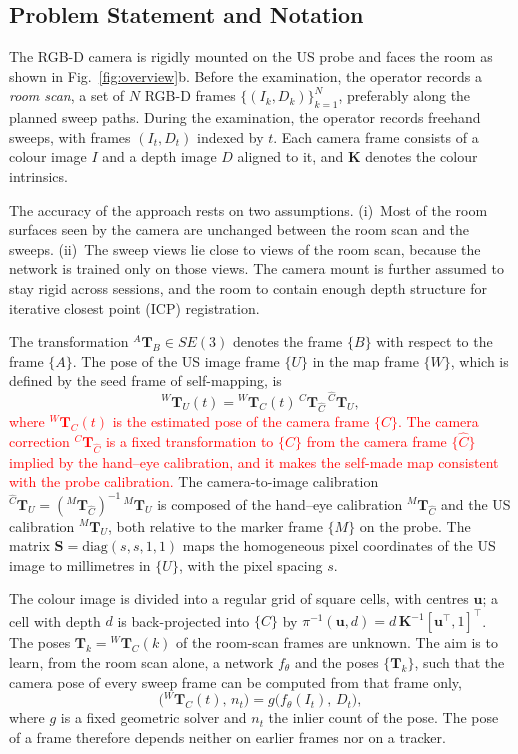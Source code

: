 \documentclass[9pt,shortpaper,twoside,web]{ieeecolor2}
\newcommand{\Tf}[2]{{}^{#1}\mathbf{T}_{#2}}
\newcommand{\Ch}{\hat{C}}%
\newcommand{\Tcorr}{\Tf{C}{\Ch}}%
\begin{document}
\subsection{Problem Statement and Notation}
\label{sec:notation}
The RGB-D camera is rigidly mounted on the US probe and faces the room as shown in Fig.~\ref{fig:overview}b. Before the examination, the operator records a \emph{room scan}, a set of $N$ RGB-D frames $\{(I_k,D_k)\}_{k=1}^{N}$, preferably along the planned sweep paths. During the examination, the operator records freehand sweeps, with frames $(I_t,D_t)$ indexed by $t$. Each camera frame consists of a colour image $I$ and a depth image $D$ aligned to it, and $\mathbf{K}$ denotes the colour intrinsics.

The accuracy of the approach rests on two assumptions. (i)~Most of the room surfaces seen by the camera are unchanged between the room scan and the sweeps. (ii)~The sweep views lie close to views of the room scan, because the network is trained only on those views. The camera mount is further assumed to stay rigid across sessions, and the room to contain enough depth structure for iterative closest point (ICP) registration.

The transformation $\Tf{A}{B}\in SE(3)$ denotes the frame $\{B\}$ with respect to the frame $\{A\}$. The pose of the US image frame $\{U\}$ in the map frame $\{W\}$, which is defined by the seed frame of self-mapping, is
\begin{equation}
  \Tf{W}{U}(t)=\Tf{W}{C}(t)\,\Tcorr\,\Tf{\Ch}{U} ,
  \label{eq:chain}
\end{equation}
\textcolor{red}{where $\Tf{W}{C}(t)$ is the estimated pose of the camera frame $\{C\}$. The camera correction $\Tcorr$ is a fixed transformation to $\{C\}$ from the camera frame $\{\Ch\}$ implied by the hand--eye calibration, and it makes the self-made map consistent with the probe calibration.} The camera-to-image calibration $\Tf{\Ch}{U}=(\Tf{M}{\Ch})^{-1}\,\Tf{M}{U}$ is composed of the hand--eye calibration $\Tf{M}{\Ch}$ and the US calibration $\Tf{M}{U}$, both relative to the marker frame $\{M\}$ on the probe. The matrix $\mathbf{S}=\mathrm{diag}(s,s,1,1)$ maps the homogeneous pixel coordinates of the US image to millimetres in $\{U\}$, with the pixel spacing $s$.  

The colour image is divided into a regular grid of square cells, with centres $\mathbf{u}$; a cell with depth $d$ is back-projected into $\{C\}$ by $\pi^{-1}(\mathbf{u},d)=d\,\mathbf{K}^{-1}[\mathbf{u}^\top,1]^\top$.  The poses $\mathbf{T}_k=\Tf{W}{C}(k)$ of the room-scan frames are unknown. The aim is to learn, from the room scan alone, a network $f_\theta$ and the poses $\{\mathbf{T}_k\}$, such that the camera pose of every sweep frame can be computed from that frame only,
\begin{equation}
  \big(\Tf{W}{C}(t),\,n_t\big)=g\big(f_\theta(I_t),\,D_t\big),
  \label{eq:problem}
\end{equation}
where $g$ is a fixed geometric solver and $n_t$ the inlier count of the pose. The pose of a frame therefore depends neither on earlier frames nor on a tracker.
\end{document}
